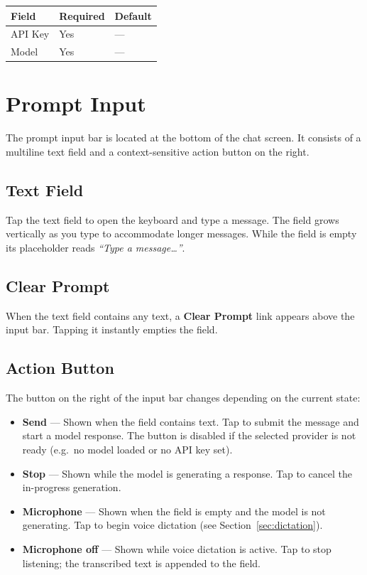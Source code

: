 \documentclass[12pt,a4paper]{article}
\begin{document}
\begin{center}
\begin{tabular}{lll}
\toprule
\textbf{Field} & \textbf{Required} & \textbf{Default} \\
\midrule
API Key & Yes & — \\
Model   & Yes & — \\
\bottomrule
\end{tabular}
\end{center}

\section{Prompt Input}

The prompt input bar is located at the bottom of the chat screen. It consists of a multiline text field and a context-sensitive action button on the right.

\subsection{Text Field}

Tap the text field to open the keyboard and type a message. The field grows vertically as you type to accommodate longer messages. While the field is empty its placeholder reads \emph{``Type a message\ldots''}.

\subsection{Clear Prompt}

When the text field contains any text, a \textbf{Clear Prompt} link appears above the input bar. Tapping it instantly empties the field.

\subsection{Action Button}

The button on the right of the input bar changes depending on the current state:

\begin{itemize}[noitemsep]
    \item \textbf{Send} — Shown when the field contains text. Tap to submit the message and start a model response. The button is disabled if the selected provider is not ready (e.g.\ no model loaded or no API key set).
    \item \textbf{Stop} — Shown while the model is generating a response. Tap to cancel the in-progress generation.
    \item \textbf{Microphone} — Shown when the field is empty and the model is not generating. Tap to begin voice dictation (see Section~\ref{sec:dictation}).
    \item \textbf{Microphone off} — Shown while voice dictation is active. Tap to stop listening; the transcribed text is appended to the field.
\end{itemize}
\end{document}
